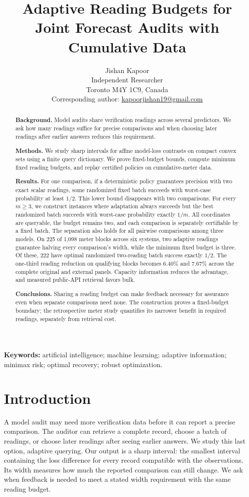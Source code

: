 \documentclass[12pt]{article}
\title{Adaptive Reading Budgets for Joint Forecast Audits with Cumulative Data}
\author{Jishan Kapoor\\Independent Researcher\\Toronto M4Y 1C9, Canada\\
Corresponding author: \href{mailto:kapoorjishan19@gmail.com}{kapoorjishan19@gmail.com}}
\date{}
\begin{document}
\maketitle
\begin{abstract}
\textbf{Background.} Model audits share verification readings across several
predictors. We ask how many readings suffice for precise comparisons and
when choosing later readings after earlier answers reduces this requirement.

\textbf{Methods.} We study sharp intervals for affine model-loss contrasts
on compact convex sets using a finite query dictionary. We prove fixed-budget
bounds, compute minimum fixed reading budgets, and replay certified policies
on cumulative-meter data.

\textbf{Results.} For one comparison, if a deterministic policy guarantees
precision with two exact scalar readings, some randomized fixed batch succeeds with
worst-case probability at least $1/2$. This lower bound disappears with two
comparisons. For every $m\geq3$, we construct instances where adaptation
always succeeds but the best randomized batch succeeds with worst-case
probability exactly $1/m$. All coordinates are queryable, the budget remains
two, and each comparison is separately certifiable by a fixed batch.
The separation also holds for all pairwise comparisons among three models.
On 225 of 1,098 meter blocks across six systems, two adaptive readings
guarantee halving every comparison's width, while the minimum fixed budget
is three. Of these, 222 have optimal randomized two-reading batch success
exactly $1/2$. The one-third reading reduction on qualifying blocks becomes
6.40\% and 7.67\% across the complete original and external panels.
Capacity information reduces the advantage, and measured public-API retrieval
favors bulk.

\textbf{Conclusions.} Sharing a reading budget can make feedback necessary
for assurance even when separate comparisons need none. The construction
proves a fixed-budget boundary; the retrospective meter study quantifies
its narrower benefit in required readings, separately from retrieval cost.
\end{abstract}
\noindent\textbf{Keywords:} artificial intelligence; machine learning;
adaptive information; minimax risk; optimal recovery; robust optimization.

\section{Introduction}
A model audit may need more verification data before it can report a precise
comparison. The auditor can retrieve a complete record, choose a batch of
readings, or choose later readings after seeing earlier answers. We study
this last option, adaptive querying. Our output is a sharp interval: the
smallest interval containing the loss difference for every record compatible
with the observations. Its width measures how much the reported comparison
can still change. We ask when feedback is needed to meet a stated width
requirement with the same reading budget.
\end{document}
